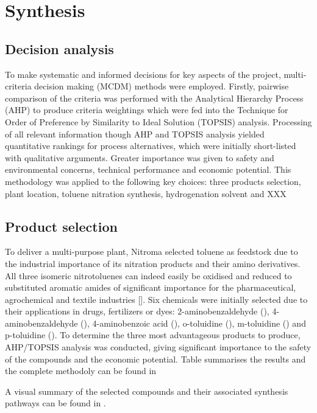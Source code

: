 \section{Synthesis}
\label{sec:synthesis}
\subsection{Decision analysis}
To make systematic and informed decisions for key aspects of the project, multi-criteria decision making (MCDM) methods were employed. Firstly, pairwise comparison of the criteria was performed with the Analytical Hierarchy Process (AHP) to produce criteria weightings which were fed into the Technique for Order of Preference by Similarity to Ideal Solution (TOPSIS) analysis. Processing of all relevant information though AHP and TOPSIS analysis yielded quantitative rankings for process alternatives, which were initially short-listed with qualitative arguments. Greater importance was given to safety and environmental concerns, technical performance and economic potential.
This methodology was applied to the following key choices: three products selection, plant location, toluene nitration synthesis, hydrogenation solvent and XXX

\subsection{Product selection}
To deliver a multi-purpose plant, Nitroma selected toluene as feedstock due to the industrial importance of its nitration products and their amino derivatives. All three isomeric nitrotoluenes can indeed easily be oxidised and reduced to substituted aromatic amides of significant importance for the pharmaceutical, agrochemical and textile industries []. Six chemicals were initially selected due to their applications in drugs, fertilizers or dyes: 2-aminobenzaldehyde (), 4-aminobenzaldehyde (), 4-aminobenzoic acid (), o-toluidine (), m-toluidine () and p-toluidine (). To determine the three most advantageous products to produce, AHP/TOPSIS analysis was conducted, giving significant importance to the safety of the compounds and the economic potential. Table summarises the results and the complete methodoly can be found in    

A visual summary of the selected compounds and their associated synthesis pathways can be found in .

